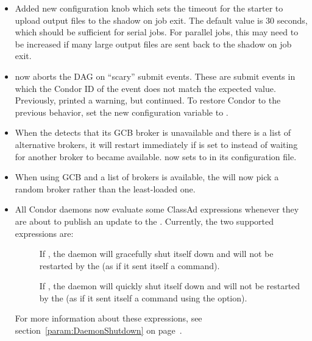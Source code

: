 \begin{itemize}

\item Added new configuration knob 
which sets the timeout for the starter to upload output files to the
shadow on job exit.  The default value is 30 seconds, which should
be sufficient for serial jobs.  For parallel jobs, this may need to
be increased if many large output files are sent back to the shadow
on job exit.

\item {} now aborts the DAG on ``scary'' submit events.
These are submit events in which
the Condor ID of the event does not match the
expected value.
Previously,  printed a warning, but continued.
To restore Condor to the previous behavior,
set the new  configuration variable
to .

\item When the  detects that its GCB broker is unavailable
and there is a list of alternative brokers,
it will restart immediately if  is
set to  instead of waiting for another broker to became available.
 now sets 
to   in its configuration file.

\item When using GCB and a list of brokers is available, the
 will now pick a random broker rather than the least-loaded
one.

\item All Condor daemons now evaluate some ClassAd expressions
  whenever they are about to publish an update to the
  .
  Currently, the two supported expressions are:
  \begin{description}
  \item[]
    If , the daemon will gracefully shut itself down and will not
    be restarted by the  (as if it sent itself a
     command).
  \item[]
    If , the daemon will quickly shut itself down and will not be
    restarted by the  (as if it sent itself a
     command using the  option).
  \end{description}
  For more information about these expressions, see
  section~\ref{param:DaemonShutdown} on
  page~\pageref{param:DaemonShutdown}.


\end{itemize}
